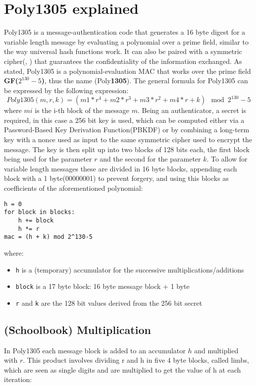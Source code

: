 \documentclass{article}
\begin{document}
\section{Poly1305 explained}
\label{poly135_101}
Poly1305 is a message-authentication code that generates a 16 byte digest for a variable length message by evaluating a polynomial over a prime field, similar
to the way universal hash functions work. It can also be paired with a symmetric cipher(\cite{poly1305_aes_bernstein}, \cite{poly1305_chacha20_iot}) 
that guarantees the confidentiality of the information exchanged. As stated, Poly1305 is a polynomial-evaluation MAC that works over the prime field 
\textbf{GF($2^{130}-5$)}, thus the name (Poly\textbf{1305}). The general formula for Poly1305 can be expressed by the following expression: 
$$Poly1305(m, r, k) = (m1 * r^4 + m2 * r^3 + m3 * r^2 + m4 * r + k) \mod{2^{130}-5} $$ 
where $mi$ is the i-th block of the message $m$. Being an authenticator, a secret is required, in this case a 256 bit key is used, which can be computed either 
via a Password-Based Key Derivation Function(PBKDF) or by combining a long-term key with a nonce used as input to the same symmetric cipher used to encrypt the 
message. The key is then split up into two blocks of 128 bits each, the first block being used for the parameter $r$ and the second for the parameter $k$. To 
allow for variable length messages these are divided in 16 byte blocks, appending each block with a 1 byte(00000001) to prevent forgery, and using this blocks 
as coefficients of the aforementioned polynomial:

\begin{Verbatim}
h = 0
for block in blocks:
    h += block
    h *= r
mac = (h + k) mod 2^130-5
\end{Verbatim}

where:
\begin{itemize}
    \item \texttt{h} is a (temporary) accumulator for the successive multiplications/additions
    \item \texttt{block} is a 17 byte block: 16 byte message block + 1 byte
    \item \texttt{r} and \texttt{k} are the 128 bit values derived from the 256 bit secret
\end{itemize}

\subsection{(Schoolbook) Multiplication}
\label{def_limb}
In Poly1305 each message block is added to an accumulator $h$ and multiplied with $r$. This product involves dividing r and h in five 4 byte blocks, called 
limbs, which are seen as single digits and are multiplied to get the value of h at each iteration:
\end{document}
